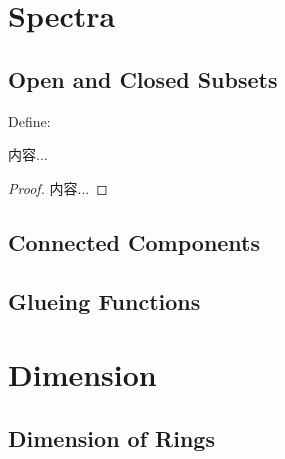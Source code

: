 \documentclass[Total.tex]{subfiles}
\begin{document}
	\chapter{Spectra}
		\section{Open and Closed Subsets}
			\begin{Def}
				Define:
			\end{Def}
			\begin{lemma}
				内容...
			\end{lemma}
			\begin{proof}
				内容...
			\end{proof}
		\section{Connected Components}
		\section{Glueing Functions}
	\chapter{Dimension}
		\section{Dimension of Rings}
\end{document}

